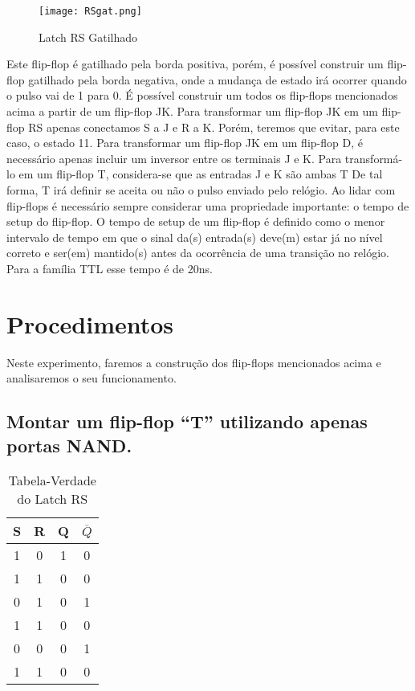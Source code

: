 \documentclass[12pt]{article}
\begin{document}
\begin{figure}[H]
	\centering
	\texttt{[image: RSgat.png]}
	\caption{Latch RS Gatilhado}
	\label{fig:RSgat}
\end{figure}

Este flip-flop é gatilhado pela borda positiva, porém, é possível construir um flip-flop gatilhado pela borda negativa, onde a mudança de estado irá ocorrer quando o pulso vai de 1 para 0.
É possível construir um todos os flip-flops mencionados acima a partir de um flip-flop JK. Para transformar um flip-flop JK em um flip-flop RS apenas conectamos S a J e R a K. Porém, teremos que evitar, para este caso, o estado 11. Para transformar um flip-flop JK em um flip-flop D, é necessário apenas incluir um inversor entre os terminais J e K. Para transformá-lo em um flip-flop T, considera-se que as entradas J e K são ambas T De tal forma, T irá definir se aceita ou não o pulso enviado pelo relógio.
Ao lidar com flip-flops é necessário sempre considerar uma propriedade importante: o tempo de setup do flip-flop. O tempo de setup de um flip-flop é definido como o menor intervalo de tempo em que o sinal da(s) entrada(s) deve(m) estar já no nível correto e ser(em) mantido(s) antes da ocorrência de uma transição no relógio.  Para a família TTL esse tempo é de 20ns.

\section{Procedimentos}
\label{sec:Procedimentos}

Neste experimento, faremos a construção dos flip-flops mencionados acima e analisaremos o seu funcionamento.

\subsection{Montar um flip-flop “T” utilizando apenas portas NAND.}
\label{2.1}

\begin{table}[H]
	\centering
	\begin{tabular}{|c|c|c|c|}
		\cline{1-4}
		\caption{Tabela-Verdade do Latch RS}
		\multicolumn{1}{|c|}{S} & \multicolumn{1}{|c|}{R} & \multicolumn{1}{|c|}{Q} & \multicolumn{1}{|c|}{$\overline{Q}$} \\
		\hline
		1 & 0 & 1 & 0  \\
		\hline
		1 & 1 & 0 & 0 \\
		\hline
		0 & 1 & 0 & 1  \\
		\hline
		1 & 1 & 0 & 0  \\
		\hline
		0 & 0 & 0 & 1  \\
		\hline
		1 & 1 & 0 & 0  \\
		\hline
	\end{tabular}
	
\end{table} 
\end{document}
